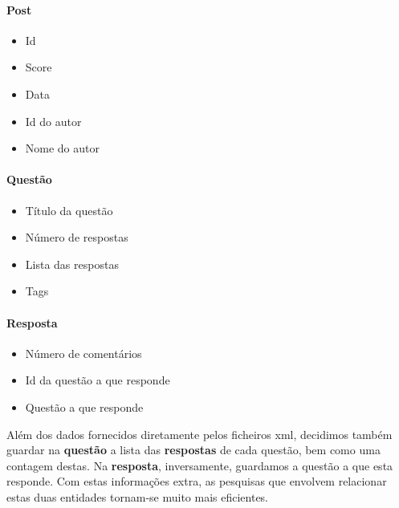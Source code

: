\documentclass[10pt,a4paper]{report}
\begin{document}
        \paragraph{Post}
            \begin{multicols}{3}
            \begin{itemize}
                \item Id
                \item Score
                \item Data
                \item Id do autor
                \item Nome do autor
            \end{itemize}
        \paragraph{Questão}
            \begin{itemize}
                \item Título da questão
                \item Número de respostas
                \item Lista das respostas
                \item Tags
            \end{itemize}

        \paragraph{Resposta}
            \begin{itemize}
                \item Número de comentários
                \item Id da questão a que responde
                \item Questão a que responde
            \end{itemize}
            \end{multicols}

    Além dos dados fornecidos diretamente pelos ficheiros xml, decidimos também
    guardar na \textbf{questão} a lista das \textbf{respostas} de cada questão,
    bem como uma contagem destas. Na \textbf{resposta}, inversamente, guardamos
    a questão a que esta responde. Com estas informações extra, as pesquisas
    que envolvem relacionar estas duas entidades tornam-se muito mais
    eficientes.
\end{document}
